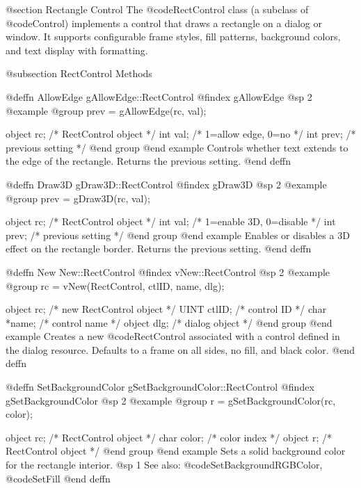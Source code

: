 @section Rectangle Control
The @code{RectControl} class (a subclass of @code{Control}) implements a
control that draws a rectangle on a dialog or window.  It supports
configurable frame styles, fill patterns, background colors, and text
display with formatting.

@subsection RectControl Methods



@deffn {AllowEdge} gAllowEdge::RectControl
@findex gAllowEdge
@sp 2
@example
@group
prev = gAllowEdge(rc, val);

object  rc;     /*  RectControl object         */
int     val;    /*  1=allow edge, 0=no         */
int     prev;   /*  previous setting           */
@end group
@end example
Controls whether text extends to the edge of the rectangle.  Returns
the previous setting.
@end deffn



@deffn {Draw3D} gDraw3D::RectControl
@findex gDraw3D
@sp 2
@example
@group
prev = gDraw3D(rc, val);

object  rc;     /*  RectControl object         */
int     val;    /*  1=enable 3D, 0=disable     */
int     prev;   /*  previous setting           */
@end group
@end example
Enables or disables a 3D effect on the rectangle border.  Returns the
previous setting.
@end deffn



@deffn {New} New::RectControl
@findex vNew::RectControl
@sp 2
@example
@group
rc = vNew(RectControl, ctlID, name, dlg);

object  rc;       /*  new RectControl object  */
UINT    ctlID;    /*  control ID              */
char    *name;    /*  control name            */
object  dlg;      /*  dialog object           */
@end group
@end example
Creates a new @code{RectControl} associated with a control defined in
the dialog resource.  Defaults to a frame on all sides, no fill, and
black color.
@end deffn



@deffn {SetBackgroundColor} gSetBackgroundColor::RectControl
@findex gSetBackgroundColor
@sp 2
@example
@group
r = gSetBackgroundColor(rc, color);

object  rc;     /*  RectControl object  */
char    color;  /*  color index         */
object  r;      /*  RectControl object  */
@end group
@end example
Sets a solid background color for the rectangle interior.
@sp 1
See also:  @code{SetBackgroundRGBColor}, @code{SetFill}
@end deffn



